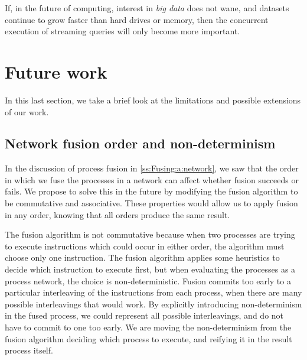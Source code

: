If, in the future of computing, interest in \emph{big data} does not wane, and datasets continue to grow faster than hard drives or memory, then the concurrent execution of streaming queries will only become more important.

\section{Future work}
\label{related/future}

In this last section, we take a brief look at the limitations and possible extensions of our work.

\subsection{Network fusion order and non-determinism}

In the discussion of process fusion in \cref{ss:Fusing:a:network}, we saw that the order in which we fuse the processes in a network can affect whether fusion succeeds or fails.
We propose to solve this in the future by modifying the fusion algorithm to be commutative and associative.
These properties would allow us to apply fusion in any order, knowing that all orders produce the same result.

The fusion algorithm is not commutative because when two processes are trying to execute instructions which could occur in either order, the algorithm must choose only one instruction.
The fusion algorithm applies some heuristics to decide which instruction to execute first, but when evaluating the processes as a process network, the choice is non-deterministic.
Fusion commits too early to a particular interleaving of the instructions from each process, when there are many possible interleavings that would work.
By explicitly introducing non-determinism in the fused process, we could represent all possible interleavings, and do not have to commit to one too early.
We are moving the non-determinism from the fusion algorithm deciding which process to execute, and reifying it in the result process itself.

